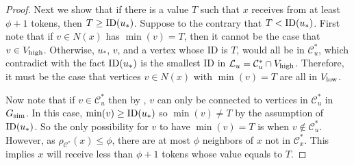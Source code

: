 \begin{proof}
Next we show that if there is a value $T$ such that $x$ receives from at least $\phi+1$ tokens, then $T \geq \operatorname{\text{{\rm ID}}}(u_{*})$. Suppose to the contrary that $T < \operatorname{\text{{\rm ID}}}(u_{*})$.  First note that if $v \in N(x)$ has $\min(v) = T$, then it cannot be the case that $v \in V_{\operatorname{high}}$. Otherwise, $u_{*}$, $v$, and a vertex whose ID is $T$,  would all be in $\mathcal{C}^{*}_{u}$, which contradict with the fact $\operatorname{\text{{\rm ID}}}(u_{*})$ is the smallest ID in $\mathcal{L}_u = \mathcal{C}^{*}_{u} \cap V_{\operatorname{high}}$. Therefore, it must be the case that vertices $v \in N(x)$ with $\min(v) = T$ are all in $V_{\operatorname{low}}$.  

Now note that if $v \in \mathcal{C}^{*}_u$ then by , $v$ can only be connected to vertices in $\mathcal{C}^{*}_u$ in $G_{\operatorname{sim}}$. In this case, $\min(v) \geq \operatorname{\text{{\rm ID}}}(u_{*})$ so $\min(v) \neq T$ by the assumption of $\operatorname{\text{{\rm ID}}}(u_{*})$. So the only possibility for $v$ to have $\min(v) = T$ is when $v \notin \mathcal{C}^{*}_u$. However, as $\rho_{\mathcal{C}^{*}}(x) \leq \phi$, there are at most $\phi$ neighbors of $x$ not in $\mathcal{C}^{*}_{x}$. This implies $x$ will receive less than $\phi + 1$ tokens whose value equals to $T$. 







\end{proof}

